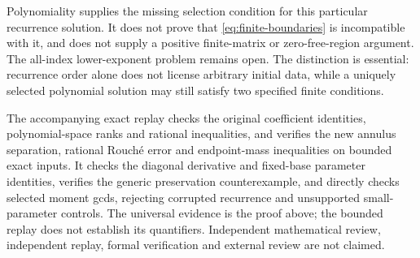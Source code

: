 \documentclass[11pt]{article}
\begin{document}
Polynomiality supplies the missing selection condition for this
particular recurrence solution. It does not prove that \eqref{eq:finite-boundaries} is
incompatible with it, and does not supply a positive finite-matrix or
zero-free-region argument. The all-index lower-exponent problem
remains open. The distinction is essential: recurrence order alone
does not license arbitrary initial data, while a uniquely selected
polynomial solution may still satisfy two specified finite conditions.

The accompanying exact replay checks the original coefficient identities,
polynomial-space ranks and rational inequalities, and verifies the new
annulus separation, rational Rouch\'e error and endpoint-mass inequalities
on bounded exact inputs. It checks the diagonal derivative and fixed-base
parameter identities, verifies the generic preservation counterexample,
and directly checks selected moment gcds, rejecting corrupted recurrence
and unsupported small-parameter controls.
The universal evidence is the proof above; the bounded replay does not
establish its quantifiers. Independent mathematical review, independent
replay, formal verification and external review are not claimed.
\end{document}
